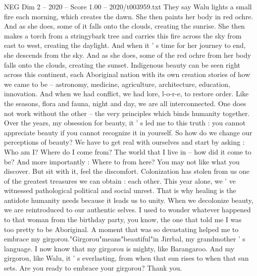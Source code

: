 \begin{textsample}{NEG Dim 2 – 2020 – Score 1.00 – 2020/t003959.txt}
They say Walu lights a small fire each morning, which creates the dawn.
She then paints her body in red ochre.
And as she does, some of it falls onto the clouds, creating the sunrise.
She then makes a torch from a stringybark tree and carries this fire across the sky from east to west, creating the daylight.
And when it ' s time for her journey to end, she descends from the sky.
And as she does, some of the red ochre from her body falls onto the clouds, creating the sunset.
Indigenous beauty can be seen right across this continent, each Aboriginal nation with its own creation stories of how we came to be -- astronomy, medicine, agriculture, architecture, education, innovation.
And when we had conflict, we had lore, l-o-r-e, to restore order.
Like the seasons, flora and fauna, night and day, we are all interconnected.
One does not work without the other -- the very principles which binds humanity together.
Over the years, my obsession for beauty, it ' s led me to this truth : you cannot appreciate beauty if you cannot recognize it in yourself.
So how do we change our perceptions of beauty?
We have to get real with ourselves and start by asking : Who am I?
Where do I come from?
The world that I live in -- how did it come to be?
And more importantly : Where to from here?
You may not like what you discover.
But sit with it, feel the discomfort.
Colonization has stolen from us one of the greatest treasures we can obtain : each other.
This year alone, we ' ve witnessed pathological political and social unrest.
That is why healing is the antidote humanity needs because it leads us to unity.
When we decolonize beauty, we are reintroduced to our authentic selves.
I used to wonder whatever happened to that woman from the birthday party, you know, the one that told me I was too pretty to be Aboriginal.
A moment that was so devastating helped me to embrace my girgorou."Girgorou"means"beautiful"in Jirrbal, my grandmother ' s language.
I now know that my girgorou is mighty, like Barangaroo.
And my girgorou, like Walu, it ' s everlasting, from when that sun rises to when that sun sets.
Are you ready to embrace your girgorou?
Thank you.

\end{textsample}
